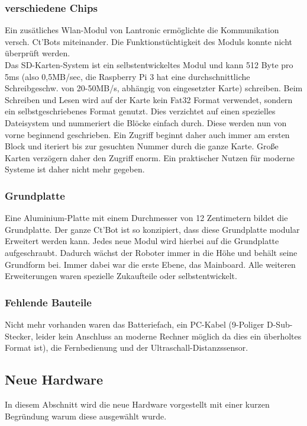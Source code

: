 \documentclass[a4paper,cleardoubleempty,BCOR1cm]{book}
\begin{document}
\subsubsection{verschiedene Chips}
Ein zusätliches Wlan-Modul von Lantronic ermöglichte die Kommunikation versch. Ct'Bots miteinander. Die Funktionstüchtigkeit des Moduls konnte nicht überprüft werden. \\
Das SD-Karten-System ist ein selbstentwickeltes Modul und kann 512 Byte pro 5ms (also 0,5MB/sec, die Raspberry Pi 3 hat eine
durchschnittliche Schreibgeschw. von 20-50MB/s, abhängig von eingesetzter Karte) schreiben. Beim Schreiben und Lesen wird auf der Karte kein Fat32 Format verwendet, sondern ein selbstgeschriebenes Format genutzt. Dies verzichtet auf einen spezielles Dateisystem und nummeriert die Blöcke einfach durch. Diese werden nun von vorne beginnend geschrieben. Ein Zugriff beginnt daher auch immer am ersten Block und iteriert bis zur gesuchten Nummer durch die ganze Karte. Große Karten verzögern daher den Zugriff enorm. Ein praktischer Nutzen für moderne Systeme ist daher nicht mehr gegeben. 

\subsubsection{Grundplatte}
Eine Aluminium-Platte mit einem Durchmesser von 12 Zentimetern bildet die Grundplatte. Der ganze Ct'Bot ist so konzipiert, dass diese Grundplatte modular Erweitert werden kann. Jedes neue Modul wird hierbei auf die Grundplatte aufgeschraubt. Dadurch wächst der Roboter immer in die Höhe und behält seine Grundform bei. Immer dabei war die erste Ebene, das Mainboard. Alle weiteren Erweiterungen waren spezielle Zukaufteile oder selbstentwickelt. 

\subsubsection{Fehlende Bauteile}
Nicht mehr vorhanden waren das Batteriefach, ein PC-Kabel (9-Poliger D-Sub-Stecker, leider kein Anschluss an moderne Rechner möglich da dies ein überholtes Format ist), die Fernbedienung und der Ultraschall-Distanzssensor. 

\subsection{Neue Hardware}
In diesem Abschnitt wird die neue Hardware vorgestellt mit einer kurzen Begründung warum diese ausgewählt wurde. 
\end{document}

